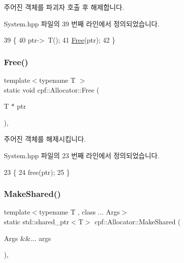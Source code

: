 주어진 객체를 파괴자 호출 후 해제합니다. 

System.\+hpp 파일의 39 번째 라인에서 정의되었습니다.


\begin{DoxyCode}
39                                    \{
40             ptr->~T();
41             \hyperlink{classcpf_1_1_allocator_af63eadbfa53045d7eede980fd5d15eb4}{Free}(ptr);
42         \}
\end{DoxyCode}
\mbox{\label{classcpf_1_1_allocator_af63eadbfa53045d7eede980fd5d15eb4}} 
\subsubsection{\texorpdfstring{Free()}{Free()}}
{\footnotesize\ttfamily template$<$typename T $>$ \\
static void cpf\+::\+Allocator\+::\+Free (\begin{DoxyParamCaption}\item[{T $\ast$}]{ptr }\end{DoxyParamCaption})\hspace{0.3cm}{\ttfamily [inline]}, {\ttfamily [static]}}

주어진 객체를 해제시킵니다. 

System.\+hpp 파일의 23 번째 라인에서 정의되었습니다.


\begin{DoxyCode}
23                                  \{
24             free(ptr);
25         \}
\end{DoxyCode}
\mbox{\label{classcpf_1_1_allocator_a3dc750d11bdf4c19e498fd855bcf8c70}} 
\subsubsection{\texorpdfstring{Make\+Shared()}{MakeShared()}}
{\footnotesize\ttfamily template$<$typename T , class ... Args$>$ \\
static std\+::shared\+\_\+ptr$<$T$>$ cpf\+::\+Allocator\+::\+Make\+Shared (\begin{DoxyParamCaption}\item[{Args \&\&...}]{args }\end{DoxyParamCaption})\hspace{0.3cm}{\ttfamily [inline]}, {\ttfamily [static]}}

